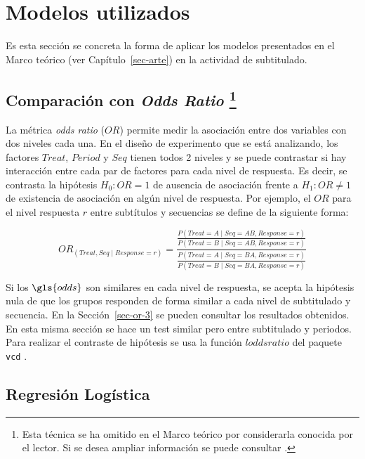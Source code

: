 \documentclass[
  12pt,
  a4paper,
  extrafontsizes,
  onecolumn,
  openright,
  table]{memoir}
\begin{document}
\normalsize

\hypertarget{sec-modelos-utilizados}{%
\section{Modelos utilizados}\label{sec-modelos-utilizados}}

Es esta sección se concreta la forma de aplicar los modelos presentados
en el Marco teórico (ver Capítulo~\ref{sec-arte}) en la actividad de
subtitulado.

\hypertarget{sec-or-2}{%
\subsection[Comparación con \emph{Odds Ratio}
]{\texorpdfstring{Comparación con \emph{Odds Ratio}
\footnote{Esta técnica se ha omitido en el Marco teórico por
  considerarla conocida por el lector. Si se desea ampliar información
  se puede consultar \textcite[p.~18]{agresti2010}.}}{Comparación con Odds Ratio }}\label{sec-or-2}}

La métrica \emph{\gls{odds ratio}} (\(OR\)) permite medir la asociación
entre dos variables con dos niveles cada una. En el diseño de
experimento que se está analizando, los factores \(Treat\), \(Period\) y
\(Seq\) tienen todos 2 niveles y se puede contrastar si hay interacción
entre cada par de factores para cada nivel de respuesta. Es decir, se
contrasta la hipótesis \(H_0: OR=1\) de ausencia de asociación frente a
\(H_1: OR \neq 1\) de existencia de asociación en algún nivel de
respuesta. Por ejemplo, el \(OR\) para el nivel respuesta \(r\) entre
subtítulos y secuencias se define de la siguiente forma:

\[
OR_{(Treat, Seq \mid Response=r)}=\frac{
    \frac{
            P(Treat=A \mid Seq=AB, Response=r)
        }{
            P(Treat=B \mid Seq=AB, Response=r)
        }
    }
    {\frac{
        P(Treat=A \mid Seq=BA, Response=r)
        }{
        P(Treat=B \mid Seq=BA, Response=r)
    }
}
\]

Si los \(\gls{odds}\) son similares en cada nivel de respuesta, se
acepta la hipótesis nula de que los grupos responden de forma similar a
cada nivel de subtitulado y secuencia. En la Sección~\ref{sec-or-3} se
pueden consultar los resultados obtenidos. En esta misma sección se hace
un test similar pero entre subtitulado y periodos. Para realizar el
contraste de hipótesis se usa la función \(loddsratio\) del paquete
\texttt{vcd} \autocite[ver][]{vcd}.

\hypertarget{sec-logistica-2}{%
\subsection{Regresión Logística}\label{sec-logistica-2}}
\end{document}
